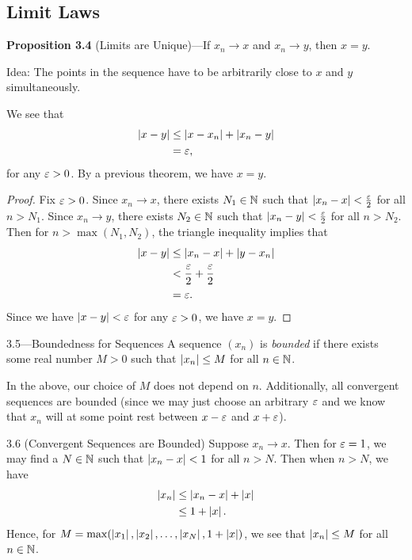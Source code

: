 \documentclass[class=article, crop=false]{standalone}
\begin{document}
  \subsection{Limit Laws}
  \textbf{Proposition 3.4} (Limits are Unique)---If $x_n\to x$ and $x_n\to y$, then $x = y$. \par
  Idea: The points in the sequence have to be arbitrarily close to $x$ and $y$ simultaneously. \par
  We see that
  \begin{align*}
    \left\lvert x - y \right\rvert&\leq \left\lvert x - x_n \right\rvert + \left\lvert x_n - y \right\rvert \\
               &= \varepsilon,
  \end{align*}
  for any $\varepsilon > 0$. By a previous theorem, we have $x = y$.
  \begin{proof}
    Fix $\varepsilon > 0$. Since $x_n\to x$, there exists $N_1\in\mathbb{N}$ such that $\left\lvert x_n - x \right\rvert < \frac{\varepsilon}{2}$ for all $n > N_1$. Since $x_n\to y$, there exists $N_2\in\mathbb{N}$ such that $\left\lvert x_n - y \right\rvert < \frac{\varepsilon}{2}$ for all $n > N_2$. Then for $n > \max(N_1, N_2)$, the triangle inequality implies that
    \begin{align*}
      \left\lvert x - y \right\rvert &\leq \left\lvert x_n - x \right\rvert + \left\lvert y - x_n \right\rvert \\
                  &< \frac{\varepsilon}{2} + \frac{\varepsilon}{2} \\
                  &= \varepsilon.
    \end{align*}
    Since we have $\left\lvert x - y \right\rvert < \varepsilon$ for any $\varepsilon > 0$, we have $x = y$.
  \end{proof}
  \begin{definition}{3.5---Boundedness for Sequences}
    A sequence $(x_n)$ is \emph{bounded} if there exists some real number $M > 0$ such that $\left\lvert x_n \right\rvert\leq M$ for all $n\in\mathbb{N}$.
  \end{definition}
  \begin{note}{}
    In the above, our choice of $M$ does not depend on $n$. Additionally, all convergent sequences are bounded (since we may just choose an arbitrary $\varepsilon$ and we know that $x_n$ will at some point rest between $x - \varepsilon$ and $x + \varepsilon$).
  \end{note}
  \begin{theorem}{3.6 (Convergent Sequences are Bounded)}
    Suppose $x_n\to x$. Then for $\varepsilon = 1$, we may find a $N\in\mathbb{N}$ such that $\left\lvert x_n - x \right\rvert < 1$ for all $n > N$. Then when $n > N$, we have
    \begin{align*}
      \left\lvert x_n \right\rvert &\leq \left\lvert x_n - x \right\rvert + \left\lvert x \right\rvert \\
                &\leq 1 + \left\lvert x \right\rvert.
    \end{align*}
    Hence, for $M = \max(\left\lvert x_1 \right\rvert, \left\lvert x_2 \right\rvert,\dotsc, \left\lvert x_N \right\rvert, 1 + \left\lvert x \right\rvert)$, we see that $\left\lvert x_n \right\rvert \leq M$ for all $n\in \mathbb{N}$.
  \end{theorem}
\end{document}
